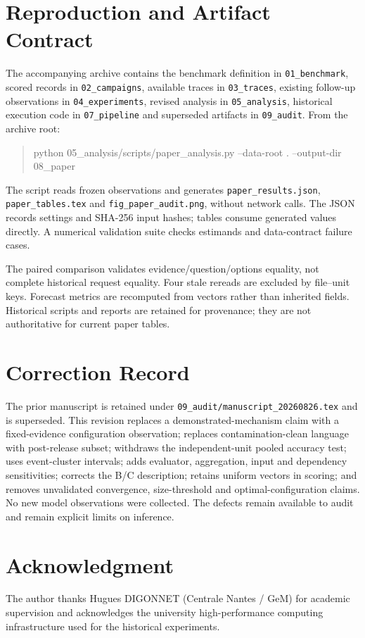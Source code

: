 \documentclass[10pt,conference]{IEEEtran}
\begin{document}
\section{Reproduction and Artifact Contract}
\label{sec:reproduce}
The accompanying archive contains the benchmark definition in
\texttt{01\_benchmark}, scored records in \texttt{02\_campaigns}, available
traces in \texttt{03\_traces}, existing follow-up observations in
\texttt{04\_experiments}, revised analysis in \texttt{05\_analysis},
historical execution code in \texttt{07\_pipeline} and superseded artifacts
in \texttt{09\_audit}. From the archive root:
\begin{quote}\small\ttfamily\raggedright
python 05\_analysis/scripts/paper\_analysis.py
--data-root . --output-dir 08\_paper
\end{quote}
The script reads frozen observations and generates \texttt{paper\_results.json},
\texttt{paper\_tables.tex} and \texttt{fig\_paper\_audit.png}, without network
calls. The JSON records settings and SHA-256 input hashes; tables consume
generated values directly. A numerical validation suite checks estimands
and data-contract failure cases.

The paired comparison validates evidence/question/options equality, not
complete historical request equality. Four stale rereads are excluded by
file--unit keys. Forecast metrics are recomputed from vectors rather than
inherited fields. Historical scripts and reports are retained for provenance;
they are not authoritative for current paper tables.

\section{Correction Record}
The prior manuscript is retained under
\texttt{09\_audit/manuscript\_20260826.tex} and is superseded.
This revision replaces a demonstrated-mechanism claim with a fixed-evidence
configuration observation; replaces contamination-clean language with
post-release subset; withdraws the independent-unit pooled accuracy test;
uses event-cluster intervals; adds evaluator, aggregation, input and dependency
sensitivities; corrects the B/C description; retains uniform vectors in scoring;
and removes unvalidated convergence, size-threshold and optimal-configuration
claims. No new model observations were collected. The defects remain
available to audit and remain explicit limits on inference.

\section*{Acknowledgment}
The author thanks Hugues DIGONNET (Centrale Nantes / GeM) for academic
supervision and acknowledges the university high-performance computing
infrastructure used for the historical experiments.
\end{document}
